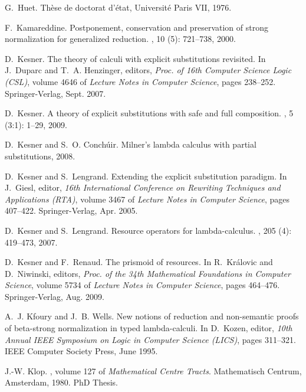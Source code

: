 \documentclass{LMCS}
\renewcommand{\>}{\rightarrow}
\begin{document}
\begin{thebibliography}{10}
G.~Huet.
\newblock Th\`ese de doctorat d'\'etat, {U}niversit\'e {P}aris VII, 1976.

F.~Kamareddine.
\newblock Postponement, conservation and preservation of strong normalization
  for generalized reduction.
, 10 (5):
  721--738, 2000.

D.~Kesner.
\newblock The theory of calculi with explicit substitutions revisited.
\newblock In J.~Duparc and T.~A. Henzinger, editors, {\em Proc. of 16th
  Computer Science Logic (CSL)}, volume 4646 of {\em Lecture Notes in Computer
  Science}, pages 238--252. Springer-Verlag, Sept. 2007.

D.~Kesner.
\newblock A theory of explicit substitutions with safe and full composition.
, 5 (3:1):
  1--29, 2009.

D.~Kesner and S.~O. Conch\'uir.
\newblock Milner's lambda calculus with partial substitutions, 2008.

D.~Kesner and S.~Lengrand.
\newblock Extending the explicit substitution paradigm.
\newblock In J.~Giesl, editor, {\em 16th International Conference on Rewriting
  Techniques and Applications (RTA)}, volume 3467 of {\em Lecture Notes in
  Computer Science}, pages 407--422. Springer-Verlag, Apr. 2005.

D.~Kesner and S.~Lengrand.
\newblock Resource operators for lambda-calculus.
, 205 (4):
  419--473, 2007.

D.~Kesner and F.~Renaud.
\newblock The prismoid of resources.
\newblock In R.~Kr{\'a}lovic and D.~Niwinski, editors, {\em Proc. of the 34th
  Mathematical Foundations in Computer Science}, volume 5734 of {\em Lecture
  Notes in Computer Science}, pages 464--476. Springer-Verlag, Aug. 2009.

A.~J. Kfoury and J.~B. Wells.
\newblock New notions of reduction and non-semantic proofs of beta-strong
  normalization in typed lambda-calculi.
\newblock In D.~Kozen, editor, {\em 10th Annual {IEEE} Symposium on Logic in
  Computer Science (LICS)}, pages 311--321. IEEE Computer Society Press, June
  1995.

J.-W. Klop.
, volume 127 of {\em Mathematical
  Centre Tracts}.
\newblock Mathematisch Centrum, Amsterdam, 1980.
\newblock PhD Thesis.


\end{thebibliography}
\end{document}
